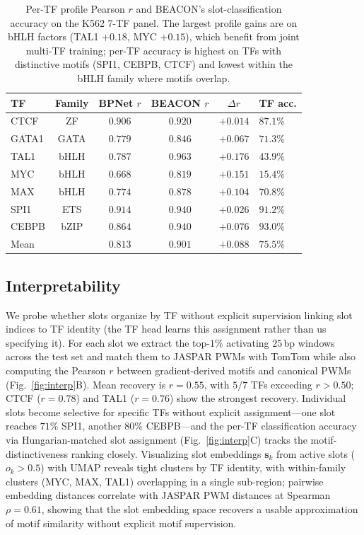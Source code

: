 \documentclass{article}
\begin{document}
\begin{table}[t]
\caption{Per-TF profile Pearson $r$ and BEACON's slot-classification accuracy on the K562 7-TF panel. The largest profile gains are on bHLH factors (TAL1 $+0.18$, MYC $+0.15$), which benefit from joint multi-TF training; per-TF accuracy is highest on TFs with distinctive motifs (SPI1, CEBPB, CTCF) and lowest within the bHLH family where motifs overlap.}
\label{tab:per-tf}
\centering\small
\begin{tabular}{lcccc l}
\toprule
TF & Family & BPNet $r$ & BEACON $r$ & $\Delta r$ & TF acc.\\
\midrule
CTCF  & ZF   & $0.906$ & $0.920$ & $+0.014$ & $87.1\%$\\
GATA1 & GATA & $0.779$ & $0.846$ & $+0.067$ & $71.3\%$\\
TAL1  & bHLH & $0.787$ & $0.963$ & $+0.176$ & $43.9\%$\\
MYC   & bHLH & $0.668$ & $0.819$ & $+0.151$ & $15.4\%$\\
MAX   & bHLH & $0.774$ & $0.878$ & $+0.104$ & $70.8\%$\\
SPI1  & ETS  & $0.914$ & $0.940$ & $+0.026$ & $91.2\%$\\
CEBPB & bZIP & $0.864$ & $0.940$ & $+0.076$ & $93.0\%$\\
\midrule
Mean  &      & $0.813$ & $0.901$ & $+0.088$ & $75.5\%$\\
\bottomrule
\end{tabular}
\end{table}

\subsection{Interpretability}
We probe whether slots organize by TF without explicit supervision linking slot indices to TF identity (the TF head learns this assignment rather than us specifying it). For each slot we extract the top-$1\%$ activating $25$\,bp windows across the test set and match them to JASPAR PWMs with TomTom while also computing the Pearson $r$ between gradient-derived motifs and canonical PWMs (Fig.~\ref{fig:interp}B). Mean recovery is $r{=}0.55$, with $5/7$ TFs exceeding $r>0.50$; CTCF ($r{=}0.78$) and TAL1 ($r{=}0.76$) show the strongest recovery. Individual slots become selective for specific TFs without explicit assignment---one slot reaches $71\%$ SPI1, another $80\%$ CEBPB---and the per-TF classification accuracy via Hungarian-matched slot assignment (Fig.~\ref{fig:interp}C) tracks the motif-distinctiveness ranking closely. Visualizing slot embeddings $\mathbf{s}_k$ from active slots ($o_k > 0.5$) with UMAP reveals tight clusters by TF identity, with within-family clusters (MYC, MAX, TAL1) overlapping in a single sub-region; pairwise embedding distances correlate with JASPAR PWM distances at Spearman $\rho{=}0.61$, showing that the slot embedding space recovers a usable approximation of motif similarity without explicit motif supervision.
\end{document}

